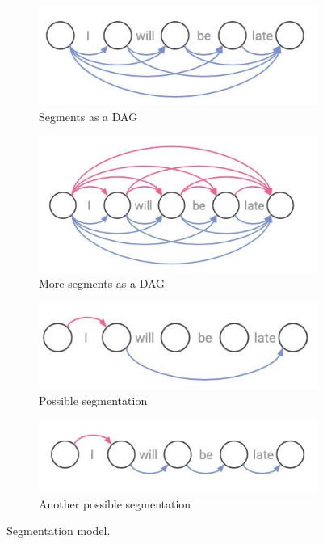 \begin{figure}
    \centering
    \begin{subfigure}[b]{0.45\textwidth}
        \centering
        \includegraphics[width=\textwidth]{figs/segmentation1.jpeg}
        \caption{Segments as a DAG}
        \label{fig:dag}
    \end{subfigure}
    \hfill
    \begin{subfigure}[b]{0.45\textwidth}
        \centering
        \includegraphics[width=\textwidth]{figs/segmentation2.jpeg}
        \caption{More segments as a DAG}
        \label{fig:dag2}
    \end{subfigure}
    \hfill
    \begin{subfigure}[b]{0.45\textwidth}
        \centering
        \includegraphics[width=\textwidth]{figs/segmentation3.jpeg}
        \caption{Possible segmentation}
        \label{fig:segmentation}
    \end{subfigure}
    \hfill
    \begin{subfigure}[b]{0.45\textwidth}
        \centering
        \includegraphics[width=\textwidth]{figs/segmentation4.jpeg}
        \caption{Another possible segmentation}
        \label{fig:segmentation2}
    \end{subfigure}
    \caption{Segmentation model.}
    \label{fig:segmentation_model}
\end{figure}

